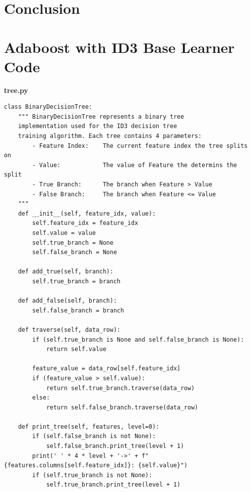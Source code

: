 \documentclass[a4paper]{article}
\begin{document}
\newpage
\section{Conclusion}

\newpage
\nocite{*}



\renewcommand{\thesection}{Appendix \Alph{section}: \hspace{-4mm}}
\setcounter{section}{0} %

\newpage
\section{Adaboost with ID3 Base Learner Code}
\label{section:adaboost-code}
\textbf{tree.py}
\begin{lstlisting}[basicstyle= \scriptsize]
class BinaryDecisionTree:
    """ BinaryDecisionTree represents a binary tree
    implementation used for the ID3 decision tree
    training algorithm. Each tree contains 4 parameters:
        - Feature Index:    The current feature index the tree splits on
        - Value:            The value of Feature the determins the split
        - True Branch:      The branch when Feature > Value
        - False Branch:     The branch when Feature <= Value
    """
    def __init__(self, feature_idx, value):
        self.feature_idx = feature_idx
        self.value = value
        self.true_branch = None
        self.false_branch = None

    def add_true(self, branch):
        self.true_branch = branch

    def add_false(self, branch):
        self.false_branch = branch

    def traverse(self, data_row):
        if (self.true_branch is None and self.false_branch is None):
            return self.value

        feature_value = data_row[self.feature_idx]
        if (feature_value > self.value):
            return self.true_branch.traverse(data_row)
        else:
            return self.false_branch.traverse(data_row)

    def print_tree(self, features, level=0):
        if (self.false_branch is not None):
            self.false_branch.print_tree(level + 1)
        print(' ' * 4 * level + '->' + f"{features.columns[self.feature_idx]}: {self.value}")
        if (self.true_branch is not None):
            self.true_branch.print_tree(level + 1)
\end{lstlisting}
\end{document}
